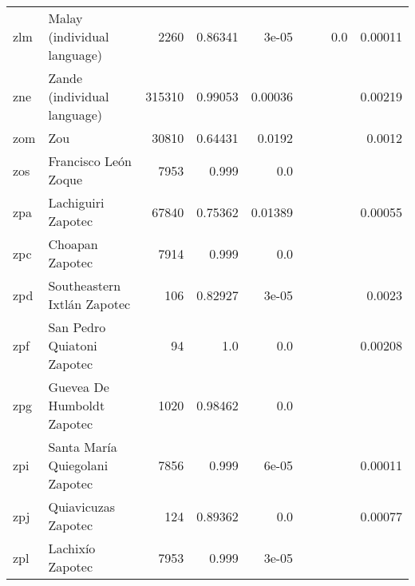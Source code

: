 \documentclass[11pt]{article}
\begin{document}
\begin{table*}[h]
{\begin{tabular}{llrrrrrrr}
zlm         & Malay (individual language)         & 2260         & 0.86341         & 3e-05         &          &          & 0.0         & 0.00011         \\

zne         & Zande (individual language)         & 315310         & 0.99053         & 0.00036         &          &          &          & 0.00219         \\

zom         & Zou         & 30810         & 0.64431         & 0.0192         &          &          &          & 0.0012         \\

zos         & Francisco León Zoque         & 7953         & 0.999         & 0.0         &          &          &          &          \\

zpa         & Lachiguiri Zapotec         & 67840         & 0.75362         & 0.01389         &          &          &          & 0.00055         \\

zpc         & Choapan Zapotec         & 7914         & 0.999         & 0.0         &          &          &          &          \\

zpd         & Southeastern Ixtlán Zapotec         & 106         & 0.82927         & 3e-05         &          &          &          & 0.0023         \\

zpf         & San Pedro Quiatoni Zapotec         & 94         & 1.0         & 0.0         &          &          &          & 0.00208         \\

zpg         & Guevea De Humboldt Zapotec         & 1020         & 0.98462         & 0.0         &          &          &          &          \\

zpi         & Santa María Quiegolani Zapotec         & 7856         & 0.999         & 6e-05         &          &          &          & 0.00011         \\

zpj         & Quiavicuzas Zapotec         & 124         & 0.89362         & 0.0         &          &          &          & 0.00077         \\

zpl         & Lachixío Zapotec         & 7953         & 0.999         & 3e-05         &          &          &          &          \\


\end{tabular}}
\end{table*}
\end{document}
